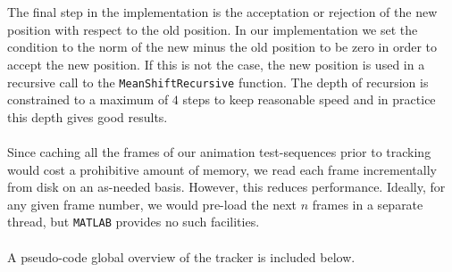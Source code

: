 \documentclass[a4paper,11pt]{article}
\begin{document}
		\\ \\
		The final step in the implementation is the acceptation or rejection of the new
		position with respect to the old position. In our implementation we set the condition
		to the norm of the new minus the old position to be zero in order to accept the new
		position. If this is not the case, the new position is used in a recursive call to
		the \verb|MeanShiftRecursive| function. The depth of recursion is constrained to a
		maximum of $4$ steps to keep reasonable speed and in practice this depth gives good
		results.
		\\ \\
		Since caching all the frames of our animation test-sequences prior to
		tracking would cost a prohibitive amount of memory, we read each frame
		incrementally from disk on an as-needed basis. However, this reduces
		performance. Ideally, for any given frame number, we would pre-load the
		next $n$ frames in a separate thread, but \verb|MATLAB| provides no such
		facilities.
		\\ \\
		A pseudo-code global overview of the tracker is included below.
\end{document}

